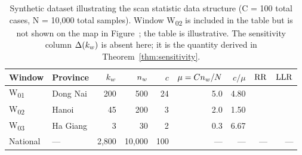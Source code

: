 
\begin{table}[ht]
\centering
\caption{Synthetic dataset illustrating the scan statistic data structure
         (C = 100 total cases, N = 10{,}000 total samples).
         Window W\textsubscript{02} is included in the table but is not shown
         on the map in Figure~; the table is illustrative.
         The sensitivity column $\Delta(k_w)$ is absent here; it is the quantity
         derived in Theorem~\ref{thm:sensitivity}.}
\label{tab:data}
\begin{tabular}{@{}llrrrrrrr@{}}
\toprule
Window & Province & $k_w$ & $n_w$ & $c$ & $\mu = Cn_w/N$ & $c/\mu$ & $\mathrm{RR}$ & $\mathrm{LLR}$ \\
\midrule
W\textsubscript{01} & Dong Nai  & 200 &  500 & 24 &  5.0 & 4.80 & \placeholder{?} & \placeholder{?} \\
W\textsubscript{02} & Hanoi     &  45 &  200 &  3 &  2.0 & 1.50 & \placeholder{?} & \placeholder{?} \\
W\textsubscript{03} & Ha Giang  &   3 &   30 &  2 &  0.3 & 6.67 & \placeholder{?} & \placeholder{?} \\
\midrule
National            & ---       & 2{,}800 & 10{,}000 & 100 & --- & --- & --- & --- \\
\bottomrule
\end{tabular}
\end{table}
